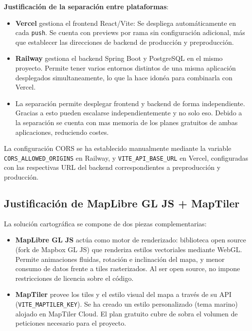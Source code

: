 \textbf{Justificación de la separación entre plataformas}:
\begin{itemize}
    \item \textbf{Vercel} gestiona el frontend React/Vite: Se despliega automáticamente en cada \texttt{push}. Se cuenta con previews por rama sin configuración adicional, más que establecer las direcciones de backend de producción y preproducción.
    \item \textbf{Railway} gestiona el backend Spring Boot y PostgreSQL en el mismo proyecto. Permite tener varios entornos distintos de una misma aplicación desplegados simultaneamente, lo que la hace idonéa para combinarla con Vercel.
    \item La separación permite desplegar frontend y backend de forma independiente. Gracias a esto pueden escalarse independientemente y no solo eso. Debido a la separación se cuenta con mas memoria de los planes gratuitos de ambas aplicaciones, reduciendo costes. 
\end{itemize}

La configuración CORS se ha establecido manualmente mediante la variable \texttt{CORS\_ALLOWED\_ORIGINS} en Railway, y \texttt{VITE\_API\_BASE\_URL} en Vercel, configuradas con las respectivas URL del backend correspondientes a preproducción y producción.

\subsection{Justificación de MapLibre GL JS + MapTiler}

La solución cartográfica se compone de dos piezas complementarias:

\begin{itemize}
    \item \textbf{MapLibre GL JS} actúa como motor de renderizado: biblioteca open source (fork de Mapbox GL JS) que renderiza estilos vectoriales mediante WebGL. Permite animaciones fluidas, rotación e inclinación del mapa, y menor consumo de datos frente a tiles rasterizados. Al ser open source, no impone restricciones de licencia sobre el código.
    \item \textbf{MapTiler} provee los tiles y el estilo visual del mapa a través de su API (\texttt{VITE\_MAPTILER\_KEY}). Se ha creado un estilo personalizado (tema marino) alojado en MapTiler Cloud. El plan gratuito cubre de sobra el volumen de peticiones necesario para el proyecto.
\end{itemize}

